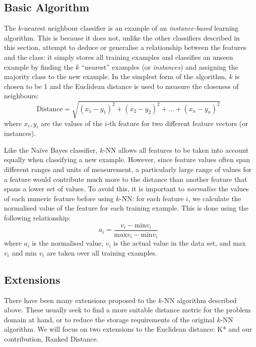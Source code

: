 \subsection{Basic Algorithm}
The $k$-nearest neighbour classifier is an example of an
\textit{instance-based} learning algorithm. This is because it does not, unlike
the other classifiers described in this section, attempt to deduce or
generalise a relationship between the features and the class: it simply stores
all training examples and classifies an unseen example by finding the $k$
``nearest'' examples (or \textit{instances}) and assigning the majority class
to the new example. In the simplest form of the algorithm, $k$ is chosen to be
1 and the Euclidean distance is used to measure the closeness of neighbours:
\begin{equation*}
\mathrm{Distance} = \sqrt{(x_1-y_1)^2 + (x_2-y_2)^2 + \ldots + (x_n-y_n)^2}
\end{equation*}
where $x_i,y_i$ are the values of the $i$-th feature for two different feature
vectors (or instances).

Like the Na\"{i}ve Bayes classifier, $k$-NN allows all features to be taken
into account equally when classifying a new example. However, since feature
values often span different ranges and units of measurement, a particularly
large range of values for a feature would contribute much more to the distance
than another feature that spans a lower set of values.
To avoid this, it is important to \textit{normalise} the
values of each numeric feature before using $k$-NN: for each feature $i$, we
calculate the normalised value of the feature for each training example. This
is done using the following relationship:
\begin{equation*}
a_i = \dfrac{v_i - \mathrm{min }v_i}{\mathrm{max }v_i - \mathrm{min }v_i}
\end{equation*}
where $a_i$ is the normalised value, $v_i$ is the actual value in the data
set, and max $v_i$ and min $v_i$ are taken over all training examples.

\subsection{Extensions}
There have been many extensions proposed to the $k$-NN algorithm described
above. These usually seek to find a more suitable distance metric for the
problem domain at hand, or to reduce the storage requirements of the original
$k$-NN algorithm. We will focus on two extensions to the Euclidean distance:
K* and our contribution, Ranked Distance.

